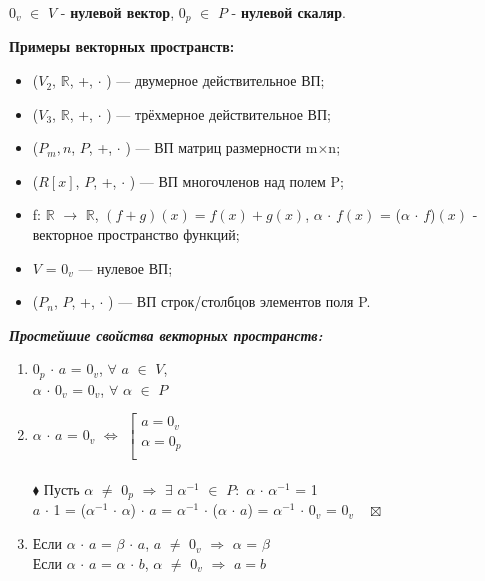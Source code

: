 \documentclass[a4paper, 12pt]{report}
\begin{document}
	\par\bigskip
	$0_v$ $\in$ $V$ - \textbf{нулевой вектор}, $0_p$ $\in$ $P$ - \textbf{нулевой скаляр}.
	\par\bigskip
	\textbf{Примеры векторных пространств:}
	\begin{itemize}
		\item ($V_2$, $\mathbb{R}$, +, $\cdot$ ) --- двумерное действительное ВП;
		\item ($V_3$, $\mathbb{R}$, +, $\cdot$ ) --- трёхмерное действительное ВП;
		\item ($P_m,n$, $P$, +, $\cdot$ ) --- ВП матриц размерности m$\times$n;
		\item ($R[x]$, $P$, +, $\cdot$ ) --- ВП многочленов над полем P;
		\item f: $\mathbb{R}$ $\to$ $\mathbb{R}$, $(f + g)(x) = f(x) + g(x)$, $\alpha$ $\cdot$ $f(x)$ = ($\alpha$ $\cdot$ $f$)$(x)$ - векторное пространство функций;
		\item $V$ = {$0_v$} --- нулевое ВП;
		\item ($P_n$, $P$, +, $\cdot$ ) --- ВП строк/столбцов элементов поля P.
	\end{itemize}
	\par\bigskip
	\textit{\textbf{Простейшие свойства векторных пространств:}}
	\begin{enumerate}
		\item $0_p$ $\cdot$ $a$ = $0_v$, $\forall$ $a$ $\in$ $V$, 
		\\$\alpha$ $\cdot$ $0_v$ = $0_v$, $\forall$ $\alpha$ $\in$ $P$
		\item $\alpha$ $\cdot$ $a$ = $0_v$ $\Leftrightarrow$ 
		$\left[ 
		\begin{gathered} 
			a = 0_v\\
			\alpha = 0_p\\
		\end{gathered} 
		\right.$
		\\\\
		$\blacklozenge$ Пусть $\alpha$ $\ne$ $0_p$ $\Rightarrow$ $\exists$ $\alpha^{-1}$ $\in$ $P:$ $\alpha$ $\cdot$ $\alpha^{-1}$ = 1
		\\ $a$ $\cdot$ 1 = ($\alpha^{-1}$ $\cdot$ $\alpha$) $\cdot$ $a$ = $\alpha^{-1}$ $\cdot$ ($\alpha$ $\cdot$ $a$) = $\alpha^{-1}$ $\cdot$ $0_v$ = $0_v \quad \boxtimes$
		\item Если $\alpha$ $\cdot$ $a$ = $\beta$ $\cdot$ $a$, $a$ $\ne$ $0_v$ $\Rightarrow$ $\alpha$ = $\beta$
		\\ Если $\alpha$ $\cdot$ $a$ = $\alpha$ $\cdot$ $b$, $\alpha$ $\ne$ $0_v$ $\Rightarrow$ $a = b$
	\end{enumerate}
	
\end{document}
